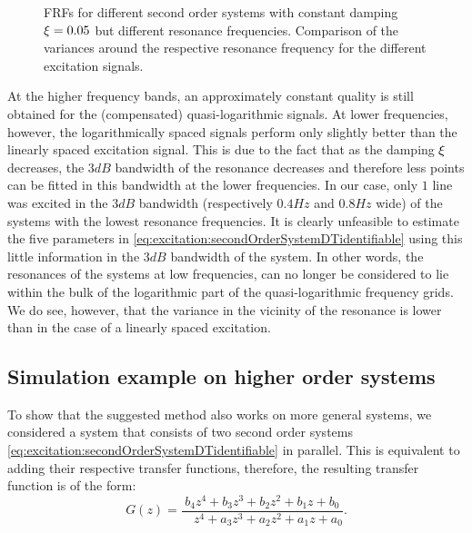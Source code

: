   \begin{figure}%
    \centering
    \setlength\figureheight{5cm}
    \setlength{}
    
    \caption[Simulated FRFs and their variances of systems with $\damping=0.05$ for different excitation signals.]{FRFs for different second order systems with constant damping
             $\damping=0.05$ but different resonance frequencies. Comparison of the
             variances around the respective resonance frequency for the different
             excitation signals.}%
    \label{fig:damping005}
  \end{figure}

  At the higher frequency bands, an approximately constant quality is still obtained for the (compensated) quasi-logarithmic signals.
  At lower frequencies, however, the logarithmically spaced signals perform only slightly better than the linearly spaced excitation signal.
  This is due to the fact that as the damping $\xi$ decreases, the $3\unit{dB}$ bandwidth of the resonance decreases and therefore less points can be fitted in this bandwidth at the lower frequencies.
  In our case, only $1$ line was excited in the $3 \unit{dB}$ bandwidth (respectively $0.4 \unit{Hz}$ and $0.8\unit{Hz}$ wide) of the systems with the lowest resonance frequencies.
  It is clearly unfeasible to estimate the five parameters in
  \eqref{eq:excitation:secondOrderSystemDTidentifiable} using this little information in the $3\unit{dB}$ bandwidth of the system.
  In other words, the resonances of the systems at low frequencies, can no longer be considered to lie within the bulk of the logarithmic part of the quasi-logarithmic frequency grids.
  We do see, however, that the variance in the vicinity of the resonance is lower than in the case of a linearly spaced excitation.

  \subsection{Simulation example on higher order systems}
To show that the suggested method also works on more general systems, we considered a system that consists of two second order systems \eqref{eq:excitation:secondOrderSystemDTidentifiable} in parallel. This is equivalent to adding their respective transfer functions, therefore, the resulting transfer function is of the form:
\begin{equation}
  G \left( z \right) 
  = \frac{         b_4 z^{4} + b_3 z^{3} + b_2 z^{2} + b_1 z + b_0}%
         {\phantom{a_4}z^{4} + a_3 z^{3} + a_2 z^{2} + a_1 z + a_0}
  \text{.}
\label{eq:tfO4}
\end{equation}

